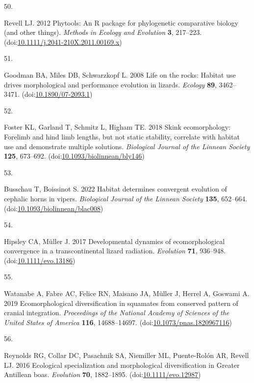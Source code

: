 \documentclass[
  11pt,
]{article}
\newlength{\cslhangindent}
\newlength{\csllabelwidth}
\newlength{\cslentryspacingunit} %
\newenvironment{CSLReferences}[2] %
 {%
  \setlength{\parindent}{0pt}
  \ifodd #1
  \let\oldpar\par
  \def\par{\hangindent=\cslhangindent\oldpar}
  \fi
  \setlength{\parskip}{#2\cslentryspacingunit}
 }%
 {}
\newcommand{\CSLLeftMargin}[1]{\parbox[t]{\csllabelwidth}{#1}}
\newcommand{\CSLRightInline}[1]{\parbox[t]{\linewidth - \csllabelwidth}{#1}\break}
\begin{document}
\begin{CSLReferences}{0}{0}
\leavevmode{}%
\CSLLeftMargin{50. }%
\CSLRightInline{Revell LJ. 2012 Phytools: An {R} package for
phylogenetic comparative biology (and other things). \emph{Methods in
Ecology and Evolution} \textbf{3}, 217--223.
(doi:\href{https://doi.org/10.1111/j.2041-210X.2011.00169.x}{10.1111/j.2041-210X.2011.00169.x})}

\leavevmode{}%
\CSLLeftMargin{51. }%
\CSLRightInline{Goodman BA, Miles DB, Schwarzkopf L. 2008 {Life on the
rocks: Habitat use drives morphological and performance evolution in
lizards}. \emph{Ecology} \textbf{89}, 3462--3471.
(doi:\href{https://doi.org/10.1890/07-2093.1}{10.1890/07-2093.1})}

\leavevmode{}%
\CSLLeftMargin{52. }%
\CSLRightInline{Foster KL, Garland T, Schmitz L, Higham TE. 2018 {Skink
ecomorphology: Forelimb and hind limb lengths, but not static stability,
correlate with habitat use and demonstrate multiple solutions}.
\emph{Biological Journal of the Linnean Society} \textbf{125}, 673--692.
(doi:\href{https://doi.org/10.1093/biolinnean/bly146}{10.1093/biolinnean/bly146})}

\leavevmode{}%
\CSLLeftMargin{53. }%
\CSLRightInline{Busschau T, Boissinot S. 2022 {Habitat determines
convergent evolution of cephalic horns in vipers}. \emph{Biological
Journal of the Linnean Society} \textbf{135}, 652--664.
(doi:\href{https://doi.org/10.1093/biolinnean/blac008}{10.1093/biolinnean/blac008})}

\leavevmode{}%
\CSLLeftMargin{54. }%
\CSLRightInline{Hipsley CA, Müller J. 2017 {Developmental dynamics of
ecomorphological convergence in a transcontinental lizard radiation}.
\emph{Evolution} \textbf{71}, 936--948.
(doi:\href{https://doi.org/10.1111/evo.13186}{10.1111/evo.13186})}

\leavevmode{}%
\CSLLeftMargin{55. }%
\CSLRightInline{Watanabe A, Fabre AC, Felice RN, Maisano JA, Müller J,
Herrel A, Goswami A. 2019 {Ecomorphological diversification in squamates
from conserved pattern of cranial integration}. \emph{Proceedings of the
National Academy of Sciences of the United States of America}
\textbf{116}, 14688--14697.
(doi:\href{https://doi.org/10.1073/pnas.1820967116}{10.1073/pnas.1820967116})}

\leavevmode{}%
\CSLLeftMargin{56. }%
\CSLRightInline{Reynolds RG, Collar DC, Pasachnik SA, Niemiller ML,
Puente-Rolón AR, Revell LJ. 2016 {Ecological specialization and
morphological diversification in {G}reater {A}ntillean boas}.
\emph{Evolution} \textbf{70}, 1882--1895.
(doi:\href{https://doi.org/10.1111/evo.12987}{10.1111/evo.12987})}


\end{CSLReferences}
\end{document}
